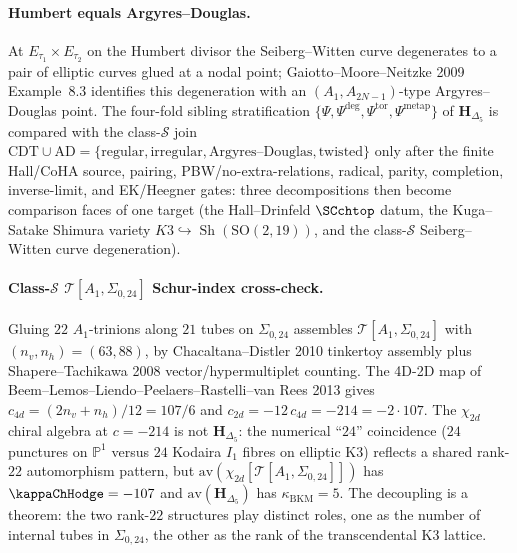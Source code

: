 \paragraph{Humbert equals Argyres--Douglas.}
At $E_{\tau_1}\times E_{\tau_2}$ on the Humbert divisor the
Seiberg--Witten curve degenerates to a pair of elliptic curves glued
at a nodal point; Gaiotto--Moore--Neitzke 2009 Example~8.3 identifies
this degeneration with an $(A_1, A_{2N-1})$-type Argyres--Douglas
point. The four-fold sibling stratification
$\{\Psi, \Psi^{\deg}, \Psi^{\mathrm{tor}}, \Psi^{\mathrm{metap}}\}$ of
$\mathbf{H}_{\Delta_5}$ is compared with the class-$\mathcal{S}$ join
$\mathrm{CDT}\cup\mathrm{AD} = \{\text{regular}, \text{irregular},
\text{Argyres--Douglas}, \text{twisted}\}$ only after the finite
Hall/CoHA source, pairing, PBW/no-extra-relations, radical, parity,
completion, inverse-limit, and EK/Heegner gates: three decompositions
then become comparison faces of one target (the Hall--Drinfeld
$\SCchtop$ datum, the Kuga--Satake
Shimura variety
$K3\hookrightarrow\operatorname{Sh}(\mathrm{SO}(2,19))$, and the
class-$\mathcal{S}$ Seiberg--Witten curve degeneration).

\paragraph{Class-$\mathcal{S}$ $\mathcal{T}[A_1,\Sigma_{0,24}]$ Schur-index cross-check.}
Gluing $22$ $A_1$-trinions along $21$ tubes on $\Sigma_{0,24}$
assembles $\mathcal{T}[A_1,\Sigma_{0,24}]$ with
$(n_v, n_h) = (63, 88)$, by Chacaltana--Distler 2010 tinkertoy
assembly plus Shapere--Tachikawa 2008 vector/hypermultiplet counting.
The 4D-2D map of Beem--Lemos--Liendo--Peelaers--Rastelli--van Rees
2013 gives
$c_{4d} = (2n_v + n_h)/12 = 107/6$ and
$c_{2d} = -12\,c_{4d} = -214 = -2\cdot 107$. The $\chi_{2d}$ chiral
algebra at $c = -214$ is not $\mathbf{H}_{\Delta_5}$: the numerical
``$24$'' coincidence ($24$ punctures on $\mathbb{P}^1$ versus $24$
Kodaira $I_1$ fibres on elliptic K3) reflects a shared rank-$22$
automorphism pattern, but
$\mathrm{av}(\chi_{2d}[\mathcal{T}[A_1,\Sigma_{0,24}]])$ has
$\kappaChHodge = -107$ and
$\mathrm{av}(\mathbf{H}_{\Delta_5})$ has $\kappa_{\mathrm{BKM}} = 5$.
The decoupling is a theorem: the two rank-$22$ structures play
distinct roles, one as the number of internal tubes in
$\Sigma_{0,24}$, the other as the rank of the transcendental K3
lattice.

